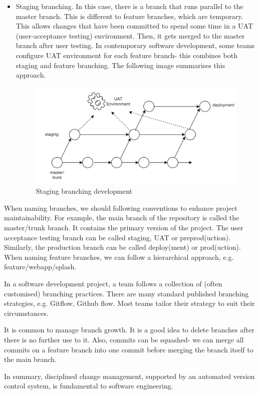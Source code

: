 \documentclass[a4paper, openany]{memoir}
\begin{document}
\begin{itemize}
    \item Staging branching. In this case, there is a branch that runs parallel to the master branch. This is different to feature branches, which are temporary. This allows changes that have been committed to spend some time in a UAT (user-acceptance testing) environment. Then, it gets merged to the master branch after user testing. In contemporary software development, some teams configure UAT environment for each feature branch- this combines both staging and feature branching. The following image summarises this approach.
    \begin{figure}[H]
        \centering
        \includegraphics[scale=0.45]{src/3.8 Staging branches.png}
        \caption{Staging branching development}
    \end{figure}
\end{itemize}

When naming branches, we should following conventions to enhance project maintainability. For example, the main branch of the repository is called the master/trunk branch. It contains the primary version of the project. The user acceptance testing branch can be called staging, UAT or preprod(uction). Similarly, the production branch can be called deploy(ment) or prod(uction). When naming feature branches, we can follow a hierarchical approach, e.g. feature/webapp/splash.

In a software development project, a team follows a collection of (often customised) branching practices. There are many standard published branching strategies, e.g. Gitflow, Github flow. Most teams tailor their strategy to suit their circumstances.

It is common to manage branch growth. It is a good idea to delete branches after there is no further use to it. Also, commits can be squashed- we can merge all commits on a feature branch into one commit before merging the branch itself to the main branch.

In summary, disciplined change management, supported by an automated version control system, is fundamental to software engineering.
\end{document}
